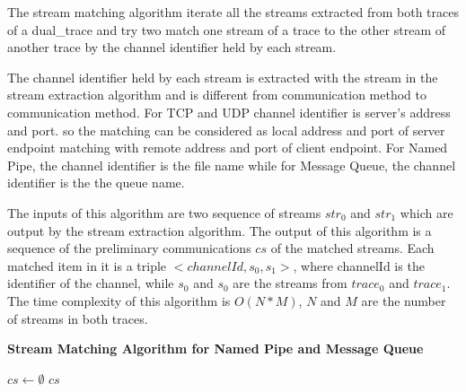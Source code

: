 The stream matching algorithm iterate all the streams extracted from both traces of a dual\_trace and try two match one stream of a trace to the other stream of another trace by the channel identifier held by each stream.

The channel identifier held by each stream is extracted with the stream in the stream extraction algorithm and is different from communication method to communication method. For TCP and UDP channel identifier is server's address and port. so the matching can be considered as local address and port of server endpoint matching with remote address and port of client endpoint. For Named Pipe, the channel identifier is the file name while for Message Queue, the channel identifier is the the queue name. 

 The inputs of this algorithm are two sequence of streams $str_0$ and $str_1$ which are output by the stream extraction algorithm. The output of this algorithm is a sequence of the preliminary communications $cs$ of the matched streams. Each matched item in it is a triple $<channelId, s_0, s_1>$, where channelId is the identifier of the channel, while $s_0$ and $s_0$ are the streams from $trace_0$ and $trace_1$.  The time complexity of this algorithm is $O(N*M)$, $N$ and $M$ are the number of streams in both traces.
 
 \begin{algorithm}[H]
\DontPrintSemicolon
\caption{{\bf Stream Matching Algorithm for Named Pipe and Message Queue} \label{matchAlg}}
$cs \leftarrow \emptyset$\; 
\KwRet $cs$\;
\end{algorithm} 

